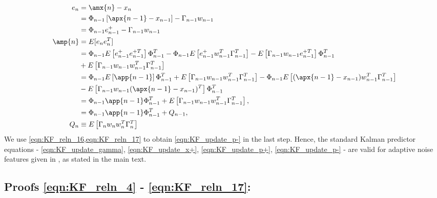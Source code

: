 \begin{align}
e_n &= \amx{n} - x_n \\
&= \Phi_{n-1}\left[\apx{n-1} - x_{n-1} \right] - \Gamma_{n-1}w_{n-1} \\
&= \Phi_{n-1}e^{+}_{n-1} - \Gamma_{n-1}w_{n-1} \\
\amp{n} &= E[e_ne_n^T] \\
&= \Phi_{n-1}E\left[e^{+}_{n-1}e^{+T}_{n-1}\right]\Phi_{n-1}^T  - \Phi_{n-1}E\left[e^{+}_{n-1}w_{n-1}^T\Gamma_{n-1}^T\right] - E\left[\Gamma_{n-1}w_{n-1}e^{+T}_{n-1}\right]\Phi_{n-1}^T  \\
& + E\left[\Gamma_{n-1}w_{n-1}w_{n-1}^T\Gamma_{n-1}^T\right] \\
&= \Phi_{n-1}E\left[\app{n-1}\right]\Phi_{n-1}^T  + E\left[\Gamma_{n-1}w_{n-1}w_{n-1}^T\Gamma_{n-1}^T\right] - \Phi_{n-1}E\left[(\apx{n-1} - x_{n-1})w_{n-1}^T\Gamma_{n-1}^T\right] \nonumber \\
& - E\left[\Gamma_{n-1}w_{n-1}(\apx{n-1} - x_{n-1})^T\right]\Phi_{n-1}^T  \nonumber  \\
&= \Phi_{n-1} \app{n-1} \Phi_{n-1}^T + E\left[\Gamma_{n-1}w_{n-1}w_{n-1}^T\Gamma_{n-1}^T\right], \label{eqn:KF_update_p-_0} \\
&= \Phi_{n-1} \app{n-1} \Phi_{n-1}^T + Q_{n-1}, \label{eqn:KF_update_p-} \\
Q_{n} & \equiv E\left[\Gamma_{n}w_{n}w_{n}^T\Gamma_{n}^T\right] 
\end{align}
We use \cref{eqn:KF_reln_16,eqn:KF_reln_17} to obtain \cref{eqn:KF_update_p-} in the last step. Hence, the standard Kalman predictor equations - \ref{eqn:KF_update_gamma}, \ref{eqn:KF_update_x+}, \ref{eqn:KF_update_p+}, \ref{eqn:KF_update_p-} - are valid for adaptive noise features given in \cite{livska2007}, as stated in the main text. 
\clearpage
\subsection{Proofs \ref{eqn:KF_reln_4} - \ref{eqn:KF_reln_17}:}

